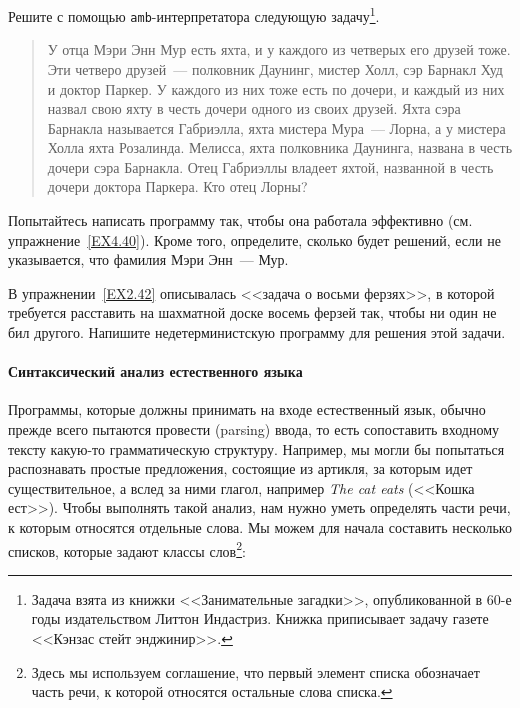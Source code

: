 \begin{exercise}{4.43}%
\label{EX4.43}%
Решите с помощью {\tt amb}-интерпретатора
следующую задачу\footnote{Задача взята из книжки <<Занимательные загадки>>,
опубликованной в 60-е годы издательством Литтон Индастриз.  Книжка
приписывает задачу газете <<Кэнзас стейт энджинир>>.}.%

\begin{quote}
У отца Мэри Энн Мур есть яхта, и у каждого из четверых его
друзей тоже.  Эти четверо друзей~--- полковник Даунинг, мистер Холл,
сэр Барнакл Худ и доктор Паркер.  У каждого из них тоже есть по
дочери, и каждый из них назвал свою яхту в честь дочери одного из
своих друзей.  Яхта сэра Барнакла называется Габриэлла, яхта мистера
Мура~--- Лорна, а у мистера Холла яхта Розалинда.  Мелисса, яхта
полковника Даунинга, названа в честь дочери сэра Барнакла.  Отец
Габриэллы владеет яхтой, названной в честь дочери доктора Паркера.
Кто отец Лорны?
\end{quote}
Попытайтесь написать программу так, чтобы она работала эффективно
(см. упражнение~\ref{EX4.40}).  Кроме того, определите,
сколько будет решений, если не указывается, что фамилия Мэри Энн~---
Мур.
\end{exercise}

\begin{exercise}{4.44}%
\label{EX4.44}%
%
В упражнении~\ref{EX2.42} описывалась
<<задача о восьми ферзях>>, в которой требуется 
расставить на
шахматной доске восемь ферзей так, чтобы ни один не бил другого.
Напишите недетерминистскую программу для решения этой задачи.
\end{exercise}

\paragraph{Синтаксический анализ естественного языка}

Программы, которые должны принимать на входе естественный
язык, обычно прежде всего пытаются провести 
 (parsing) ввода, то есть сопоставить 
входному тексту какую-то грамматическую
структуру.  Например, мы могли бы попытаться распознавать простые
предложения, состоящие из артикля, за которым идет существительное, а
вслед за ними глагол, например {\em The cat eats} (<<Кошка ест>>).  Чтобы
выполнять такой анализ, нам нужно уметь определять части речи, к
которым относятся отдельные слова.  Мы можем для начала составить
несколько списков, которые задают классы слов\footnote{Здесь мы 
используем соглашение, что первый элемент
списка обозначает часть речи, к которой относятся остальные слова
списка.}:

